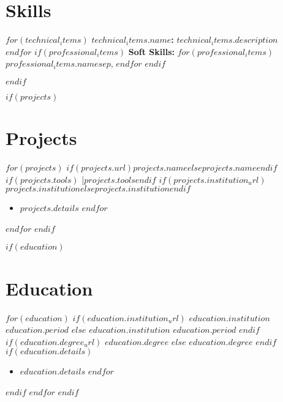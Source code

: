 \documentclass[10.5pt,a4paper]{article}
\newcommand{\daterange}[1]{\textbf{#1}}
\newcommand{\entryHeader}[2]{\noindent\textbf{#1} \hfill \daterange{#2}}
\newcommand{\entryHeaderLinked}[3]{\noindent\textbf{\href{#1}{#2}} \hfill \daterange{#3}}
\newcommand{\entrySubHeader}[1]{\textit{#1}}
\newcommand{\entrySubHeaderLinked}[2]{\textit{\href{#1}{#2}}}
\newenvironment{entryDetails}
  {%
    \begin{itemize}[leftmargin=2.5em, rightmargin=2.5em, itemsep=0.5pt, topsep=1pt, parsep=0pt]
  }
  {%
    \end{itemize}
    \vspace{-0.1cm}
  }
\begin{document}
\section*{Skills}
\begin{multicols}{2}
	\raggedcolumns
	$for(technical_items)$
	\noindent\textbf{$technical_items.name$:} $technical_items.description$\\[1.5pt]
	$endfor$
	$if(professional_items)$
	\noindent\textbf{Soft Skills:} $for(professional_items)$$professional_items.name$$sep$, $endfor$
	$endif$
\end{multicols}
\vspace{-1.5ex}
$endif$

$if(projects)$
\section*{Projects}
$for(projects)$
\noindent\textbf{$if(projects.url)$\href{$projects.url$}{$projects.name$}$else$$projects.name$$endif$}$if(projects.tools)$ \quad|\quad \textit{\small $projects.tools$}$endif$ \hfill \textbf{$if(projects.institution_url)$\href{$projects.institution_url$}{$projects.institution$}$else$\textit{$projects.institution$}$endif$}
\begin{entryDetails}
	$for(projects.details)$
	\item $projects.details$
	$endfor$
\end{entryDetails}
$endfor$
$endif$

$if(education)$
\section*{Education}
$for(education)$
$if(education.institution_url)$
\entryHeaderLinked{$education.institution_url$}{$education.institution$}{$education.period$}
$else$
\entryHeader{$education.institution$}{$education.period$}
$endif$
\\
$if(education.degree_url)$
\entrySubHeaderLinked{$education.degree_url$}{$education.degree$}
$else$
\entrySubHeader{$education.degree$}
$endif$
$if(education.details)$
\begin{itemize}[leftmargin=1.5em, rightmargin=1em, itemsep=0.5pt, topsep=1pt, parsep=0pt]
	$for(education.details)$
	\item $education.details$
	      $endfor$
\end{itemize}
\vspace{-0.1cm}
$endif$
$endfor$
$endif$
\end{document}

